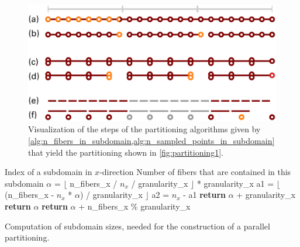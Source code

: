 \begin{figure}
  \centering%
  \includegraphics[width=\textwidth]{images/implementation/partitioning_algorithm.pdf}%
  \caption{Visualization of the steps of the partitioning algorithms given by \cref{alg:n_fibers_in_subdomain,alg:n_sampled_points_in_subdomain} that yield the partitioning shown in \cref{fig:partitioning1}.}%
  \label{fig:partitioning_algorithm}%
\end{figure}%

\begin{algorithm}
  \begin{algorithmic}[1]%
    \Require Index of a subdomain in $x$-direction
    \Ensure Number of fibers that are contained in this subdomain
    \Statex
    \State   $\alpha$ = $\lfloor$ n\_fibers\_x / $n_x$ / granularity\_x $\rfloor$ * granularity\_x   \label{alg:3.2}
    \Statex
    \State a1 = $\lfloor$(n\_fibers\_x - $n_x$ * $\alpha$) / granularity\_x $\rfloor$ \label{alg:3.3}  
    \State a2 = $n_x$ - a1                        \label{alg:3.4}              
    \Statex
      \label{alg:3.5}
      \State \textbf{return} $\alpha$ + granularity\_x \label{alg:3.6}
    \label{alg:3.7}
      \State \textbf{return} $\alpha$                        \label{alg:3.8}
    \Else  {}  \label{alg:3.9}
      \State \textbf{return} $\alpha$ + n\_fibers\_x \% granularity\_x  \label{alg:3.10}
    \EndIf
    \EndProcedure
  \end{algorithmic}%
  \caption{Computation of subdomain sizes, needed for the construction of a parallel partitioning.}%
  \label{alg:n_fibers_in_subdomain}%
\end{algorithm}%

